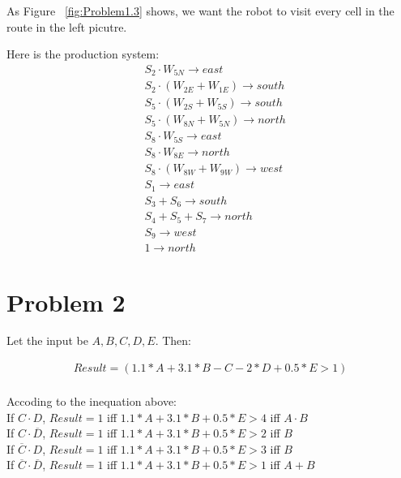 \documentclass[paper=a4, fontsize=11pt]{scrartcl} %
\numberwithin{equation}{section} %
\numberwithin{figure}{section} %
\numberwithin{table}{section} %
\begin{document}
As Figure ~\ref{fig:Problem1.3} shows, we want the robot to visit every cell 
in the route in the left picutre.

Here is the production system:
\boldmath \begin{align*}
&S_2 \cdot W_{5N} \longrightarrow east\\
&S_2 \cdot (W_{2E} + W_{1E}) \longrightarrow south\\
&S_5 \cdot (W_{2S}+W_{5S}) \longrightarrow south\\
&S_5 \cdot (W_{8N}+W_{5N}) \longrightarrow north\\
&S_8 \cdot W_{5S} \longrightarrow east\\
&S_8 \cdot W_{8E} \longrightarrow north\\
&S_8 \cdot (W_{8W}+W_{9W}) \longrightarrow west\\
&S_1 \longrightarrow east\\
&S_3+S_6 \longrightarrow south\\
&S_4+S_5+S_7 \longrightarrow north\\
&S_9 \longrightarrow west\\
&1 \longrightarrow north
\end{align*}


\section{Problem 2}

Let the input be $A, B, C, D, E$. Then:

\begin{align*}
Result=(1.1*A+3.1*B-C-2*D+0.5*E>1)\\
\end{align*}

Accoding to the inequation above:\\
If $C \cdot D$, $Result=1$ iff $1.1*A+3.1*B+0.5*E>4$ iff $A \cdot B$\\
If $C \cdot \overline{D}$, $Result=1$ iff $1.1*A+3.1*B+0.5*E>2$ iff $B$\\
If $\overline{C} \cdot D$, $Result=1$ iff $1.1*A+3.1*B+0.5*E>3$  iff $B$\\
If $\overline{C} \cdot \overline{D}$, $Result=1$ iff $1.1*A+3.1*B+0.5*E>1$ iff $A + B$\\
\end{document}
